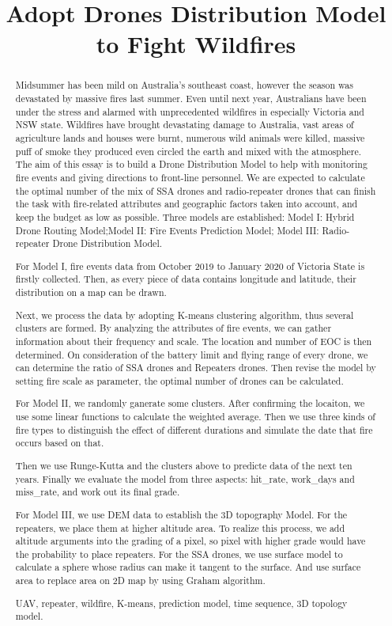 \documentclass{mcmthesis}
\title{Adopt Drones Distribution Model to Fight Wildfires}
\begin{document}
\begin{abstract}

Midsummer has been mild on Australia’s southeast coast, however the season was devastated by massive ﬁres last summer. Even until next year, Australians have been under the stress and alarmed with unprecedented wildﬁres in especially Victoria and NSW state. Wildﬁres have brought devastating damage to Australia, vast areas of agriculture lands and houses were burnt, numerous wild animals were killed, massive puﬀ of smoke they produced even circled the earth and mixed with the atmosphere. The aim of this essay is to build a Drone Distribution Model to help with monitoring ﬁre events and giving directions to front-line personnel. We are expected to calculate the optimal number of the mix of SSA drones and radio-repeater drones that can ﬁnish the task with ﬁre-related attributes and geographic factors taken into account, and keep the budget as low as possible. Three models are established: Model I: Hybrid Drone Routing Model;Model II: Fire Events Prediction Model; Model III: Radio-repeater Drone Distribution Model.

For Model I, fire events data from October 2019 to January 2020 of Victoria State is firstly collected. Then, as every piece of data contains longitude and latitude, their distribution on a map can be drawn.

Next, we process the data by adopting K-means clustering algorithm, thus several clusters are formed. By analyzing the attributes of fire events, we can gather information about their frequency and scale. The location and number of EOC is then determined. On consideration of the battery limit and flying range of every drone, we can determine the ratio of SSA drones and Repeaters drones. Then revise the model by setting fire scale as parameter, the optimal number of drones can be calculated.

For Model II, we randomly ganerate some clusters. After confirming the locaiton, we use some linear functions to calculate the weighted average. Then we use three kinds of fire types to distinguish the effect of different durations and simulate the date that fire occurs based on that.

Then we use Runge-Kutta and the clusters above to predicte data of the next ten years. Finally we  evaluate the model from three aspects: hit\_rate, work\_days and miss\_rate, and work out its final grade.

For Model III, we use DEM data to establish the 3D topography Model. For the repeaters, we place them at higher altitude area. To realize this process, we add altitude arguments into the grading of a pixel, so pixel with higher grade would have the probability to place repeaters. For the SSA drones, we use surface model to calculate a sphere whose  radius can make it tangent to the surface. And use surface area to replace area on 2D map by using Graham algorithm.



\begin{keywords}
UAV, repeater, wildﬁre, K-means, prediction model, time sequence, 3D topology model. 
\end{keywords}
\end{abstract}
\end{document}
